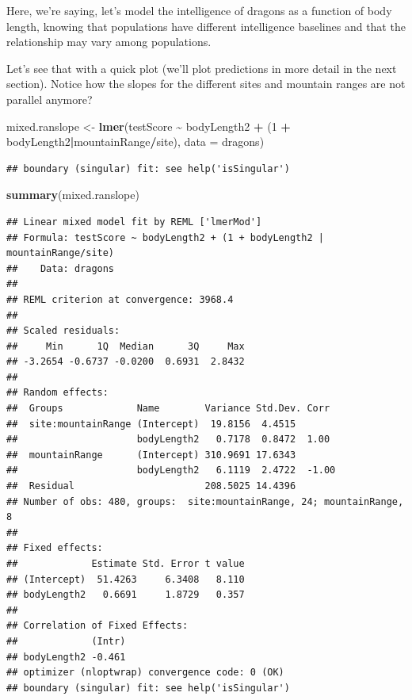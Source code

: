 \documentclass[
]{article}
\newenvironment{Shaded}{\begin{snugshade}}{\end{snugshade}}
\newcommand{\AttributeTok}[1]{\textcolor[rgb]{0.13,0.29,0.53}{#1}}
\newcommand{\DecValTok}[1]{\textcolor[rgb]{0.00,0.00,0.81}{#1}}
\newcommand{\FunctionTok}[1]{\textcolor[rgb]{0.13,0.29,0.53}{\textbf{#1}}}
\newcommand{\NormalTok}[1]{#1}
\newcommand{\OtherTok}[1]{\textcolor[rgb]{0.56,0.35,0.01}{#1}}
\newcommand{\SpecialCharTok}[1]{\textcolor[rgb]{0.81,0.36,0.00}{\textbf{#1}}}
\begin{document}
Here, we're saying, let's model the intelligence of dragons as a
function of body length, knowing that populations have different
intelligence baselines and that the relationship may vary among
populations.

Let's see that with a quick plot (we'll plot predictions in more detail
in the next section). Notice how the slopes for the different sites and
mountain ranges are not parallel anymore?

\begin{Shaded}
\begin{Highlighting}[]
\NormalTok{mixed.ranslope }\OtherTok{\textless{}{-}} \FunctionTok{lmer}\NormalTok{(testScore }\SpecialCharTok{\textasciitilde{}}\NormalTok{ bodyLength2 }\SpecialCharTok{+}\NormalTok{ (}\DecValTok{1} \SpecialCharTok{+}\NormalTok{ bodyLength2}\SpecialCharTok{|}\NormalTok{mountainRange}\SpecialCharTok{/}\NormalTok{site), }\AttributeTok{data =}\NormalTok{ dragons)}
\end{Highlighting}
\end{Shaded}

\begin{verbatim}
## boundary (singular) fit: see help('isSingular')
\end{verbatim}

\begin{Shaded}
\begin{Highlighting}[]
\FunctionTok{summary}\NormalTok{(mixed.ranslope)}
\end{Highlighting}
\end{Shaded}

\begin{verbatim}
## Linear mixed model fit by REML ['lmerMod']
## Formula: testScore ~ bodyLength2 + (1 + bodyLength2 | mountainRange/site)
##    Data: dragons
## 
## REML criterion at convergence: 3968.4
## 
## Scaled residuals: 
##     Min      1Q  Median      3Q     Max 
## -3.2654 -0.6737 -0.0200  0.6931  2.8432 
## 
## Random effects:
##  Groups             Name        Variance Std.Dev. Corr 
##  site:mountainRange (Intercept)  19.8156  4.4515       
##                     bodyLength2   0.7178  0.8472  1.00 
##  mountainRange      (Intercept) 310.9691 17.6343       
##                     bodyLength2   6.1119  2.4722  -1.00
##  Residual                       208.5025 14.4396       
## Number of obs: 480, groups:  site:mountainRange, 24; mountainRange, 8
## 
## Fixed effects:
##             Estimate Std. Error t value
## (Intercept)  51.4263     6.3408   8.110
## bodyLength2   0.6691     1.8729   0.357
## 
## Correlation of Fixed Effects:
##             (Intr)
## bodyLength2 -0.461
## optimizer (nloptwrap) convergence code: 0 (OK)
## boundary (singular) fit: see help('isSingular')
\end{verbatim}
\end{document}
